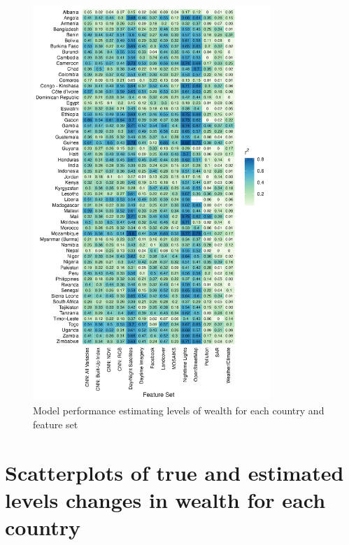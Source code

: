 \documentclass{article}
\begin{document}
\begin{figure}[H]
    \centering
    \includegraphics[width=0.8\textwidth]{figures/country_featureset_r2.png}
    \caption{Model performance estimating levels of wealth for each country and feature set}
     \label{fig:country_featureset_r2}
\end{figure}

\newpage
\section{Scatterplots of true and estimated levels changes in wealth for each country}
\label{si:scatter_changes}
\end{document}
